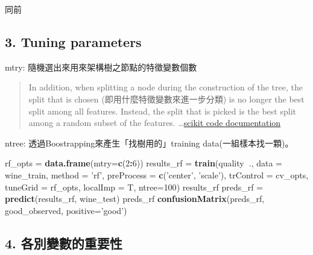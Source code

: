 \documentclass[]{book}
\newenvironment{Shaded}{\begin{snugshade}}{\end{snugshade}}
\newcommand{\KeywordTok}[1]{\textcolor[rgb]{0.13,0.29,0.53}{\textbf{#1}}}
\newcommand{\DataTypeTok}[1]{\textcolor[rgb]{0.13,0.29,0.53}{#1}}
\newcommand{\DecValTok}[1]{\textcolor[rgb]{0.00,0.00,0.81}{#1}}
\newcommand{\StringTok}[1]{\textcolor[rgb]{0.31,0.60,0.02}{#1}}
\newcommand{\OperatorTok}[1]{\textcolor[rgb]{0.81,0.36,0.00}{\textbf{#1}}}
\newcommand{\NormalTok}[1]{#1}
\begin{document}
同前

\hypertarget{tuning-parameters}{%
\subsection{3. Tuning parameters}\label{tuning-parameters}}

mtry: 隨機選出來用來架構樹之節點的特徵變數個數

\begin{quote}
In addition, when splitting a node during the construction of the tree, the split that is chosen (即用什麼特徵變數來進一步分類) is no longer the best split among all features. Instead, the split that is picked is the best split among a random subset of the features. \ldots{}\href{https://scikit-learn.org/stable/modules/ensemble.html\#forest}{scikit code documentation}
\end{quote}

ntree: 透過Boostrapping來產生「找樹用的」training data(一組樣本找一顆)。

\begin{Shaded}
\begin{Highlighting}[]
\NormalTok{rf_opts =}\StringTok{ }\KeywordTok{data.frame}\NormalTok{(}\DataTypeTok{mtry=}\KeywordTok{c}\NormalTok{(}\DecValTok{2}\OperatorTok{:}\DecValTok{6}\NormalTok{))}
\NormalTok{results_rf =}\StringTok{ }\KeywordTok{train}\NormalTok{(quality}\OperatorTok{~}\NormalTok{., }
                   \DataTypeTok{data =}\NormalTok{ wine_train,}
                   \DataTypeTok{method =} \StringTok{'rf'}\NormalTok{,}
                   \DataTypeTok{preProcess =} \KeywordTok{c}\NormalTok{(}\StringTok{'center'}\NormalTok{, }\StringTok{'scale'}\NormalTok{),}
                   \DataTypeTok{trControl =}\NormalTok{ cv_opts,}
                   \DataTypeTok{tuneGrid =}\NormalTok{ rf_opts,}
                   \DataTypeTok{localImp =}\NormalTok{ T,}
                   \DataTypeTok{ntree=}\DecValTok{100}\NormalTok{)}
\NormalTok{results_rf}
\NormalTok{preds_rf =}\StringTok{ }\KeywordTok{predict}\NormalTok{(results_rf, wine_test)}
\NormalTok{preds_rf}
\KeywordTok{confusionMatrix}\NormalTok{(preds_rf, good_observed, }\DataTypeTok{positive=}\StringTok{'good'}\NormalTok{)}
\end{Highlighting}
\end{Shaded}

\subsection{4. 各別變數的重要性}
\end{document}
